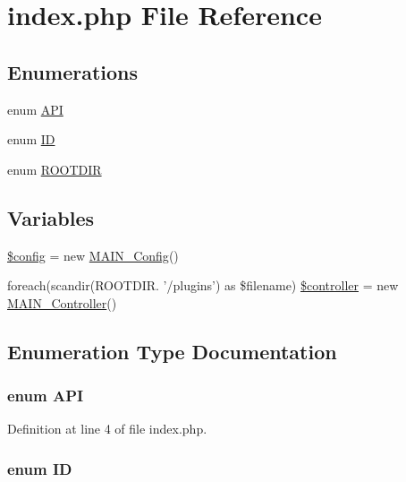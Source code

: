 \hypertarget{index_8php}{
\section{index.php File Reference}
\label{de/d20/index_8php}
}
\subsection*{Enumerations}
\begin{DoxyCompactItemize}
\item 
enum \hyperlink{index_8php_ab2d7ab3465c4ea6c2054e6307dde8255}{API} 
\item 
enum \hyperlink{index_8php_a094c367727273b4da2b960ca3b3edc06}{ID} 
\item 
enum \hyperlink{index_8php_a97c0f936c01d480557c8694b263f3d5e}{ROOTDIR} 
\end{DoxyCompactItemize}
\subsection*{Variables}
\begin{DoxyCompactItemize}
\item 
\hyperlink{index_8php_a49c7011be9c979d9174c52a8b83e5d8e}{\$config} = new \hyperlink{classMAIN__Config}{MAIN\_\-Config}()
\item 
foreach(scandir(ROOTDIR. '/plugins') as \$filename) \hyperlink{index_8php_a75aab33cb166ec47d76ab7d7d2d61450}{\$controller} = new \hyperlink{classMAIN__Controller}{MAIN\_\-Controller}()
\end{DoxyCompactItemize}


\subsection{Enumeration Type Documentation}
\hypertarget{index_8php_ab2d7ab3465c4ea6c2054e6307dde8255}{
\subsubsection[{API}]{\setlength{\rightskip}{0pt plus 5cm}enum {\bf API}}}
\label{de/d20/index_8php_ab2d7ab3465c4ea6c2054e6307dde8255}


Definition at line 4 of file index.php.\hypertarget{index_8php_a094c367727273b4da2b960ca3b3edc06}{
\subsubsection[{ID}]{\setlength{\rightskip}{0pt plus 5cm}enum {\bf ID}}}
\label{de/d20/index_8php_a094c367727273b4da2b960ca3b3edc06}


